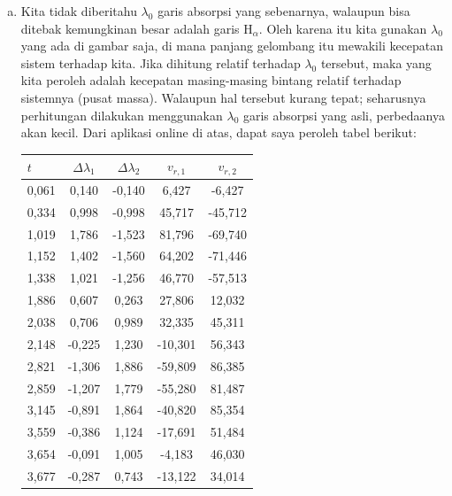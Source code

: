\documentclass[11pt,fleqn]{exam}
\begin{document}
\begin{questions}
\begin{enumerate}[a).]
	\item Kita tidak diberitahu $\lambda_0$ garis absorpsi yang sebenarnya, walaupun bisa ditebak kemungkinan besar adalah garis H$_{\alpha}$. Oleh karena itu kita gunakan $\lambda_0$ yang ada di gambar saja, di mana panjang gelombang itu mewakili kecepatan sistem terhadap kita. Jika dihitung relatif terhadap $\lambda_0$ tersebut, maka yang kita peroleh adalah kecepatan masing-masing bintang relatif terhadap sistemnya (pusat massa). Walaupun hal tersebut kurang tepat; seharusnya perhitungan dilakukan menggunakan $\lambda_0$ garis absorpsi yang asli, perbedaanya akan kecil. Dari aplikasi online di atas, dapat saya peroleh tabel berikut:
	\begin{table}[H]
		\centering
		\small
		\begin{tabular}{|l|c|c|c|c|}
			\hline
			$t$ & $\Delta \lambda_1$ & $\Delta \lambda_2$ & $v_{r,1}$ & $v_{r,2}$ \\
			\hline
			\hline
			0,061  &  0,140  &  -0,140  &  6,427  &  -6,427  \\
			0,334  &  0,998  &  -0,998  &  45,717  &  -45,712  \\
			1,019  &  1,786  &  -1,523  &  81,796  &  -69,740  \\
			1,152  &  1,402  &  -1,560  &  64,202  &  -71,446  \\
			1,338  &  1,021  &  -1,256  &  46,770  &  -57,513  \\
			1,886  &  0,607  &  0,263  &  27,806  &  12,032  \\
			2,038  &  0,706  &  0,989  &  32,335  &  45,311  \\
			2,148  &  -0,225  &  1,230  &  -10,301  &  56,343  \\
			2,821  &  -1,306  &  1,886  &  -59,809  &  86,385  \\
			2,859  &  -1,207  &  1,779  &  -55,280  &  81,487  \\
			3,145  &  -0,891  &  1,864  &  -40,820  &  85,354  \\
			3,559  &  -0,386  &  1,124  &  -17,691  &  51,484  \\
			3,654  &  -0,091  &  1,005  &  -4,183  &  46,030  \\
			3,677  &  -0,287  &  0,743  &  -13,122  &  34,014  \\
			\hline		
		\end{tabular}
	\end{table}


\end{enumerate}
\end{questions}
\end{document}
